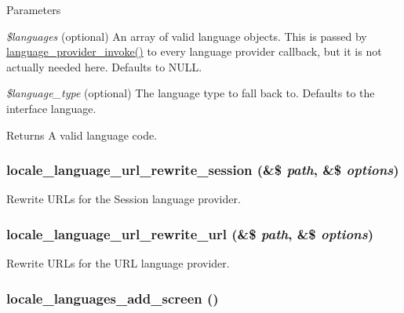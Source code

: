 \begin{DoxyParams}{Parameters}
\item[{\em \$languages}](optional) An array of valid language objects. This is passed by \hyperlink{group__language__negotiation_ga031f4e0102fa2365a45709ff6935fee2}{language\_\-provider\_\-invoke()} to every language provider callback, but it is not actually needed here. Defaults to NULL. \item[{\em \$language\_\-type}](optional) The language type to fall back to. Defaults to the interface language.\end{DoxyParams}
\begin{DoxyReturn}{Returns}
A valid language code. 
\end{DoxyReturn}
\hypertarget{group__locale_ga510f99d2bec3b7011fe45efed603b1d5}{
\subsubsection[{locale\_\-language\_\-url\_\-rewrite\_\-session}]{\setlength{\rightskip}{0pt plus 5cm}locale\_\-language\_\-url\_\-rewrite\_\-session (\&\$ {\em path}, \/  \&\$ {\em options})}}
\label{group__locale_ga510f99d2bec3b7011fe45efed603b1d5}
Rewrite URLs for the Session language provider. \hypertarget{group__locale_gaafdcd20ea42d6ce5573ece18d3fb9cdd}{
\subsubsection[{locale\_\-language\_\-url\_\-rewrite\_\-url}]{\setlength{\rightskip}{0pt plus 5cm}locale\_\-language\_\-url\_\-rewrite\_\-url (\&\$ {\em path}, \/  \&\$ {\em options})}}
\label{group__locale_gaafdcd20ea42d6ce5573ece18d3fb9cdd}
Rewrite URLs for the URL language provider. \hypertarget{group__locale_ga717959709d412fc1039f7436501dbf49}{
\subsubsection[{locale\_\-languages\_\-add\_\-screen}]{\setlength{\rightskip}{0pt plus 5cm}locale\_\-languages\_\-add\_\-screen ()}}
